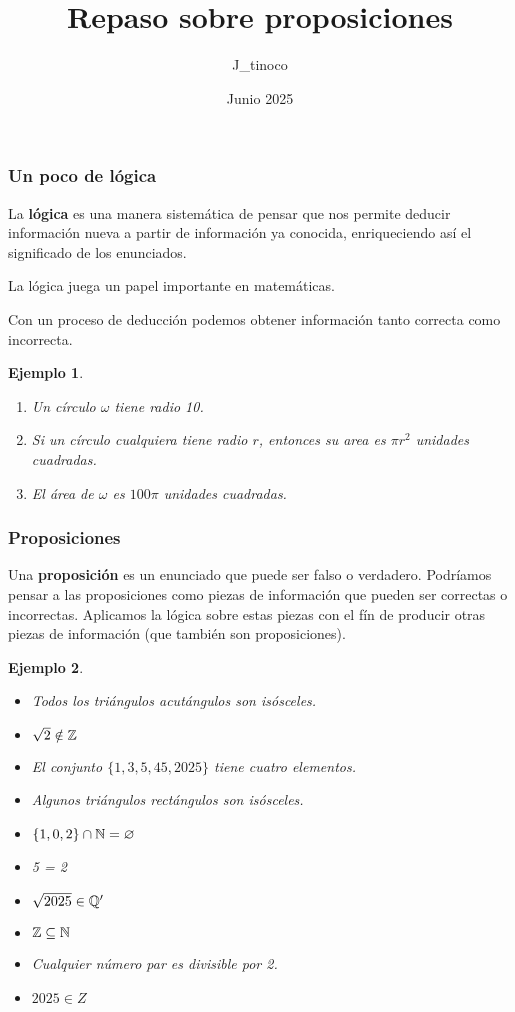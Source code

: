 \documentclass[10pt]{beamer}
\title{Repaso sobre proposiciones}
\author{J\_tinoco}
\date{Junio 2025}
\newtheorem{ejemplo}{Ejemplo}
\begin{document}
    \frame{\titlepage}
    \begin{frame}
        \frametitle{Un poco de lógica}
        La \textbf{lógica} es una manera sistemática de pensar que nos permite deducir información nueva a partir de
        información ya conocida, enriqueciendo así el significado de los enunciados.

        \vspace{2mm}
        La lógica juega un papel importante en matemáticas.

        \vspace{2mm}
        Con un proceso de deducción podemos obtener información tanto correcta como incorrecta.

        \begin{ejemplo}
            \begin{enumerate}
                \item Un círculo $\omega$ tiene radio 10.
                \item Si un círculo cualquiera tiene radio $r$, entonces su area es $\pi r^2$ unidades cuadradas.
                \item El área de $\omega$ es $100 \pi$ unidades cuadradas.
            \end{enumerate}
        \end{ejemplo}
    \end{frame}

    \begin{frame}
        \frametitle{Proposiciones}
        Una \textbf{proposición} es un enunciado que puede ser falso o verdadero.
        Podríamos pensar a las proposiciones como piezas de información que pueden ser correctas o incorrectas.
        Aplicamos la lógica sobre estas piezas con el fín de producir otras piezas de información (que también son proposiciones).

        \begin{ejemplo}
            \begin{itemize}
                \item Todos los triángulos acutángulos son isósceles.
                \item $\sqrt {2} \notin \mathbb{Z}$
                \item El conjunto $\{1, 3, 5, 45, 2025\}$ tiene cuatro elementos.
                \item Algunos triángulos rectángulos son isósceles.
                \item $\{1, 0, 2\} \cap \mathbb{N} = \varnothing$
                \item 5 = 2
                \item $\sqrt {2025} \in \mathbb{Q}'$
                \item $\mathbb{Z} \subseteq \mathbb{N}$
                \item Cualquier número par es divisible por 2.
                \item $2025 \in Z$
            \end{itemize}
        \end{ejemplo}
    \end{frame}
\end{document}
